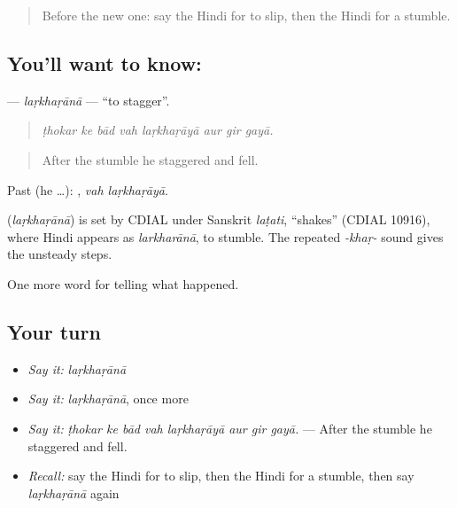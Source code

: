 \label{lesson:HI-C297-larkharana}



\begin{quote}
Before the new one: say the Hindi for to slip, then the Hindi for a stumble.
\end{quote}

\subsection*{You'll want to know: }
\textbf{} — \emph{laṛkhaṛānā} — \textquotedblleft{}to stagger\textquotedblright{}.

\begin{quote}
       
\end{quote}

\begin{quote}
\emph{ṭhokar ke bād vah laṛkhaṛāyā aur gir gayā.}
\end{quote}

\begin{quote}
After the stumble he staggered and fell.
\end{quote}

Past (he …):  , \emph{vah laṛkhaṛāyā}.

\begin{cousinweb}
\textbf{} (\emph{laṛkhaṛānā}) is set by CDIAL under Sanskrit \emph{laṭati}, \textquotedblleft{}shakes\textquotedblright{} (CDIAL 10916), where Hindi appears as \emph{larkharānā}, to stumble. The repeated \emph{-khaṛ-} sound gives the unsteady steps.
\end{cousinweb}

\begin{grammarlens}[title={What you've built}]
One more word for telling what happened.
\end{grammarlens}

\subsection*{Your turn}
\begin{itemize}
\raggedright
  \item \emph{Say it:} \emph{laṛkhaṛānā}
  \item \emph{Say it:} \emph{laṛkhaṛānā}, once more
  \item \emph{Say it:} \emph{ṭhokar ke bād vah laṛkhaṛāyā aur gir gayā.} — After the stumble he staggered and fell.
  \item \emph{Recall:} say the Hindi for to slip, then the Hindi for a stumble, then say \emph{laṛkhaṛānā} again
\end{itemize}

